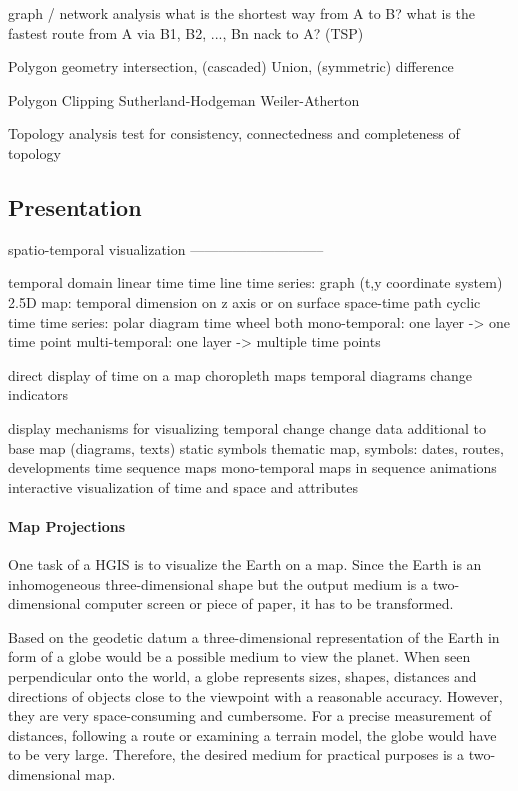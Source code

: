 graph / network analysis
  what is the shortest way from A to B?
  what is the fastest route from A via B1, B2, ..., Bn nack to A? (TSP)

Polygon geometry
  intersection, (cascaded) Union, (symmetric) difference

Polygon Clipping
  Sutherland-Hodgeman
  Weiler-Atherton

Topology analysis
  test for consistency, connectedness and completeness of topology


\subsection{Presentation} %
\label{sub:presentation}

spatio-temporal visualization
-----------------------------

temporal domain
  linear time
    time line
    time series: graph (t,y coordinate system)
    2.5D map: temporal dimension on z axis or on surface
    space-time path
  cyclic time
    time series: polar diagram
    time wheel
  both
    mono-temporal: one layer -> one time point
    multi-temporal: one layer -> multiple time points
\cite[p. 144]{ott2001time}

direct display of time on a map
  choropleth maps
  temporal diagrams
  change indicators

display mechanisms for visualizing temporal change
  change data         additional to base map (diagrams, texts)
  static symbols      thematic map, symbols: dates, routes, developments
  time sequence maps  mono-temporal maps in sequence
  animations          interactive visualization of time and space and attributes
\cite[p. 146-147]{ott2001time}

\paragraph{Map Projections} %
\label{par:map_projections}

One task of a HGIS is to visualize the Earth on a map. Since the Earth is an inhomogeneous three-dimensional shape but the output medium is a two-dimensional computer screen or piece of paper, it has to be transformed.

Based on the geodetic datum a three-dimensional representation of the Earth in form of a globe would be a possible medium to view the planet. When seen perpendicular onto the world, a globe represents sizes, shapes, distances and directions of objects close to the viewpoint with a reasonable accuracy. However, they are very space-consuming and cumbersome. For a precise measurement of distances, following a route or examining a terrain model, the globe would have to be very large. Therefore, the desired medium for practical purposes is a two-dimensional map.


